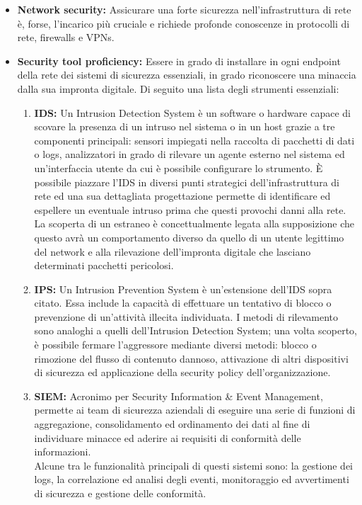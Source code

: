     \begin{itemize}
        \item \textbf{Network security:} Assicurare una forte sicurezza nell'infrastruttura di rete è, forse, l'incarico più cruciale e richiede profonde conoscenze in protocolli di rete, firewalls e VPNs.
        \item \textbf{Security tool proficiency:} Essere in grado di installare in ogni endpoint della rete dei sistemi di sicurezza essenziali, in grado riconoscere una minaccia dalla sua impronta digitale. Di seguito una lista degli strumenti essenziali:
        \begin{enumerate}
            \item \textbf{IDS:} Un Intrusion Detection System è un software o hardware capace di scovare la presenza di un intruso nel sistema o in un host grazie a tre componenti principali: sensori impiegati nella raccolta di pacchetti di dati o logs, analizzatori in grado di rilevare un agente esterno nel sistema ed un'interfaccia utente da cui è possibile configurare lo strumento. È possibile piazzare l'IDS in diversi punti strategici dell'infrastruttura di rete ed una sua dettagliata progettazione permette di identificare ed espellere un eventuale intruso prima che questi provochi danni alla rete.\\
            La scoperta di un estraneo è concettualmente legata alla supposizione che questo avrà un comportamento diverso da quello di un utente legittimo del network e alla rilevazione dell'impronta digitale che lasciano determinati pacchetti pericolosi.
            \item \textbf{IPS:} Un Intrusion Prevention System è un'estensione dell'IDS sopra citato. Essa include la capacità di effettuare un tentativo di blocco o prevenzione di un'attività illecita individuata. I metodi di rilevamento sono analoghi a quelli dell'Intrusion Detection System; una volta scoperto, è possibile fermare l'aggressore mediante diversi metodi: blocco o rimozione del flusso di contenuto dannoso, attivazione di altri dispositivi di sicurezza ed applicazione della security policy dell'organizzazione.
            \item \textbf{SIEM:} Acronimo per Security Information \& Event Management, permette ai team di sicurezza aziendali di eseguire una serie di funzioni di aggregazione, consolidamento ed ordinamento dei dati al fine di individuare minacce ed aderire ai requisiti di conformità delle informazioni.\\
            Alcune tra le funzionalità principali di questi sistemi sono: la gestione dei logs, la correlazione ed analisi degli eventi, monitoraggio ed avvertimenti di sicurezza e gestione delle conformità. 

\end{enumerate}
\end{itemize}
